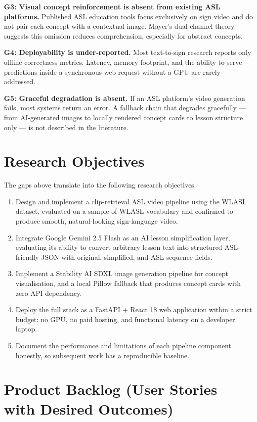 \documentclass[12pt,a4paper,oneside]{report}
\begin{document}
\textbf{G3: Visual concept reinforcement is absent from existing ASL platforms.} Published ASL education tools focus exclusively on sign video and do not pair each concept with a contextual image. Mayer's dual-channel theory suggests this omission reduces comprehension, especially for abstract concepts.

\textbf{G4: Deployability is under-reported.} Most text-to-sign research reports only offline correctness metrics. Latency, memory footprint, and the ability to serve predictions inside a synchronous web request without a GPU are rarely addressed.

\textbf{G5: Graceful degradation is absent.} If an ASL platform's video generation fails, most systems return an error. A fallback chain that degrades gracefully --- from AI-generated images to locally rendered concept cards to lesson structure only --- is not described in the literature.

\section{Research Objectives}

The gaps above translate into the following research objectives.

\begin{enumerate}[leftmargin=2em,itemsep=0.2em]
  \item Design and implement a clip-retrieval ASL video pipeline using the WLASL dataset, evaluated on a sample of WLASL vocabulary and confirmed to produce smooth, natural-looking sign-language video.
  \item Integrate Google Gemini 2.5 Flash as an AI lesson simplification layer, evaluating its ability to convert arbitrary lesson text into structured ASL-friendly JSON with original, simplified, and ASL-sequence fields.
  \item Implement a Stability AI SDXL image generation pipeline for concept visualisation, and a local Pillow fallback that produces concept cards with zero API dependency.
  \item Deploy the full stack as a FastAPI + React 18 web application within a strict budget: no GPU, no paid hosting, and functional latency on a developer laptop.
  \item Document the performance and limitations of each pipeline component honestly, so subsequent work has a reproducible baseline.
\end{enumerate}

\section{Product Backlog (User Stories with Desired Outcomes)}
\end{document}
